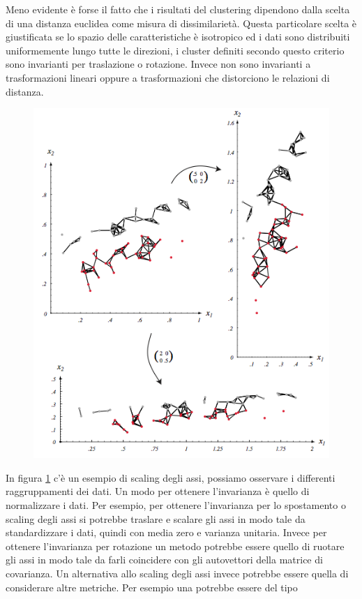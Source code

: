 \noindent Meno evidente è forse il fatto che i risultati del clustering dipendono dalla scelta di una distanza euclidea come misura di dissimilarietà. Questa particolare scelta è giustificata se lo spazio delle caratteristiche è isotropico ed i dati sono distribuiti uniformemente lungo tutte le direzioni, i cluster definiti secondo questo criterio sono invarianti per traslazione o rotazione. Invece non sono invarianti a trasformazioni lineari oppure a trasformazioni che distorciono le relazioni di distanza. 
\begin{figure}
\centering
\includegraphics[scale=0.8]{img/similarieta1.png}
\caption{}
\label{similarieta1}
\end{figure}
In figura \ref{similarieta1} c'è un esempio di scaling degli assi, possiamo osservare i differenti raggruppamenti dei dati. Un modo per ottenere l'invarianza è quello di normalizzare i dati. Per esempio, per ottenere l'invarianza per lo spostamento o scaling degli assi si potrebbe traslare e scalare gli assi in modo tale da standardizzare i dati, quindi con media zero e varianza unitaria. Invece per ottenere l'invarianza per rotazione un metodo potrebbe essere quello di ruotare gli assi in modo tale da farli coincidere con gli autovettori della matrice di covarianza. Un alternativa allo scaling degli assi invece potrebbe essere quella di considerare altre metriche. Per esempio una potrebbe essere del tipo
